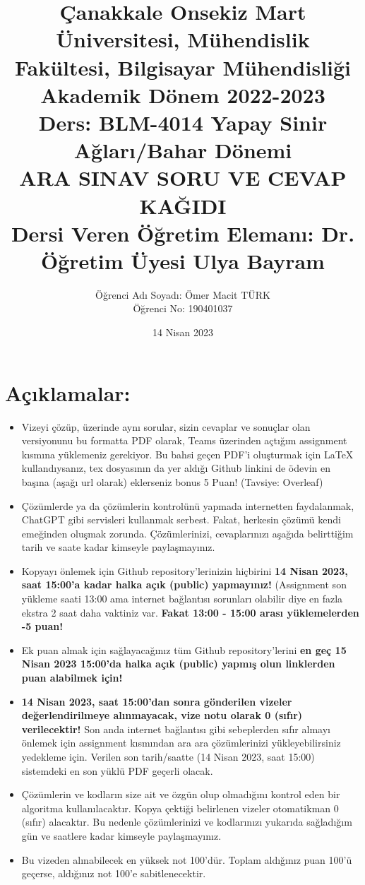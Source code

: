 \documentclass[11pt]{article}
\title{Çanakkale Onsekiz Mart Üniversitesi, Mühendislik Fakültesi, Bilgisayar Mühendisliği Akademik Dönem 2022-2023\\
Ders: BLM-4014 Yapay Sinir Ağları/Bahar Dönemi\\ 
ARA SINAV SORU VE CEVAP KAĞIDI\\
Dersi Veren Öğretim Elemanı: Dr. Öğretim Üyesi Ulya Bayram}
\author{%
\begin{minipage}{\textwidth}
\raggedright
Öğrenci Adı Soyadı: Ömer Macit TÜRK\\ %
Öğrenci No: 190401037
\end{minipage}%
}
\date{14 Nisan 2023}
\begin{document}
\maketitle

\vspace{-.5in}
\section*{Açıklamalar:}
\begin{itemize}
    \item Vizeyi çözüp, üzerinde aynı sorular, sizin cevaplar ve sonuçlar olan versiyonunu bu formatta PDF olarak, Teams üzerinden açtığım assignment kısmına yüklemeniz gerekiyor. Bu bahsi geçen PDF'i oluşturmak için LaTeX kullandıysanız, tex dosyasının da yer aldığı Github linkini de ödevin en başına (aşağı url olarak) eklerseniz bonus 5 Puan! (Tavsiye: Overleaf)
    \item Çözümlerde ya da çözümlerin kontrolünü yapmada internetten faydalanmak, ChatGPT gibi servisleri kullanmak serbest. Fakat, herkesin çözümü kendi emeğinden oluşmak zorunda. Çözümlerinizi, cevaplarınızı aşağıda belirttiğim tarih ve saate kadar kimseyle paylaşmayınız. 
    \item Kopyayı önlemek için Github repository'lerinizin hiçbirini \textbf{14 Nisan 2023, saat 15:00'a kadar halka açık (public) yapmayınız!} (Assignment son yükleme saati 13:00 ama internet bağlantısı sorunları olabilir diye en fazla ekstra 2 saat daha vaktiniz var. \textbf{Fakat 13:00 - 15:00 arası yüklemelerden -5 puan!}
    \item Ek puan almak için sağlayacağınız tüm Github repository'lerini \textbf{en geç 15 Nisan 2023 15:00'da halka açık (public) yapmış olun linklerden puan alabilmek için!}
    \item \textbf{14 Nisan 2023, saat 15:00'dan sonra gönderilen vizeler değerlendirilmeye alınmayacak, vize notu olarak 0 (sıfır) verilecektir!} Son anda internet bağlantısı gibi sebeplerden sıfır almayı önlemek için assignment kısmından ara ara çözümlerinizi yükleyebilirsiniz yedekleme için. Verilen son tarih/saatte (14 Nisan 2023, saat 15:00) sistemdeki en son yüklü PDF geçerli olacak.
    \item Çözümlerin ve kodların size ait ve özgün olup olmadığını kontrol eden bir algoritma kullanılacaktır. Kopya çektiği belirlenen vizeler otomatikman 0 (sıfır) alacaktır. Bu nedenle çözümlerinizi ve kodlarınızı yukarıda sağladığım gün ve saatlere kadar kimseyle paylaşmayınız.
    \item Bu vizeden alınabilecek en yüksek not 100'dür. Toplam aldığınız puan 100'ü geçerse, aldığınız not 100'e sabitlenecektir.

\end{itemize}
\end{document}
